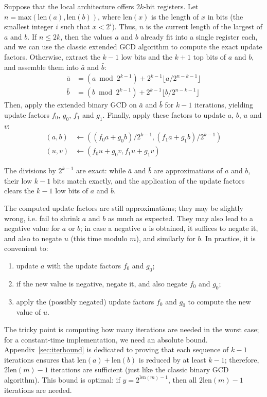 \documentclass{llncs}
\newcommand{\bitlength}{\text{len}}
\begin{document}
Suppose that the local architecture offers $2k$-bit registers. Let
$n = \text{max}(\bitlength(a), \bitlength(b))$, where $\bitlength(x)$ is
the length of $x$ in bits (the smallest integer $i$ such that
$x < 2^i$). Thus, $n$ is the current length of the largest of $a$ and $b$.
If $n \leq 2k$, then the values $a$ and $b$ already fit into a single
register each, and we can use the classic extended GCD algorithm to
compute the exact update factors. Otherwise, extract the $k-1$ low bits
and the $k+1$ top bits of $a$ and $b$, and assemble them into $\bar a$ and
$\bar b$:
\begin{align*}
    \bar a &= (a \bmod 2^{k-1}) + 2^{k-1} \lfloor a / 2^{n-k-1} \rfloor \\
    \bar b &= (b \bmod 2^{k-1}) + 2^{k-1} \lfloor b / 2^{n-k-1} \rfloor
\end{align*}
Then, apply the extended binary GCD on $\bar a$ and $\bar b$ for $k-1$
iterations, yielding update factors $f_0$, $g_0$, $f_1$ and $g_1$.
Finally, apply these factors to update $a$, $b$, $u$ and $v$:
\begin{align*}
    (a, b) &\leftarrow ((f_0 a + g_0 b) / 2^{k-1}, (f_1 a + g_1 b) / 2^{k-1}) \\
    (u, v) &\leftarrow (f_0 u + g_0 v, f_1 u + g_1 v)
\end{align*}

The divisions by $2^{k-1}$ are exact: while $\bar a$ and $\bar b$ are
approximations of $a$ and $b$, their low $k-1$ bits match exactly, and
the application of the update factors clears the $k-1$ low bits of $a$
and $b$.

The computed update factors are still approximations; they may be
slightly wrong, i.e. fail to shrink $a$ and $b$ as much as expected.
They may also lead to a negative value for $a$ or $b$; in case a
negative $a$ is obtained, it suffices to negate it, and also to negate
$u$ (this time modulo $m$), and similarly for $b$. In practice, it is
convenient to:
\begin{enumerate}
    \item update $a$ with the update factors $f_0$ and $g_0$;
    \item if the new value is negative, negate it, and also negate
    $f_0$ and $g_0$;
    \item apply the (possibly negated) update factors $f_0$ and $g_0$
    to compute the new value of $u$.
\end{enumerate}

The tricky point is computing how many iterations are needed in the
worst case; for a constant-time implementation, we need an absolute
bound. Appendix~\ref{sec:iterbound} is dedicated to proving that each
sequence of $k-1$ iterations ensures that $\bitlength(a) + \bitlength(b)$
is reduced by at least $k-1$; therefore, $2\bitlength(m)-1$ iterations are
sufficient (just like the classic binary GCD algorithm). This bound
is optimal: if $y = 2^{\bitlength(m)-1}$, then all $2\bitlength(m)-1$
iterations are needed.
\end{document}
